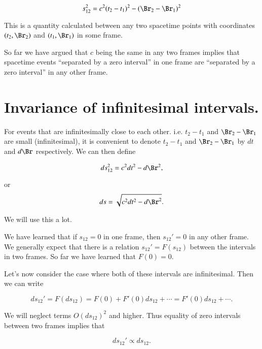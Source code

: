 \begin{equation}\label{eqn:relativisticElectrodynamicsL2:50}
s_{12}^2 = c^2 (t_2 - t_1)^2 - (\Br_2 - \Br_1)^2
\end{equation}

This is a quantity calculated between any two spacetime points with coordinates $(t_2, \Br_2)$ and $(t_1, \Br_1)$ in some frame.

So far we have argued that $c$ being the same in any two frames implies that spacetime events ``separated by a zero interval'' in one frame are ``separated by a zero interval'' in any other frame.

\section{Invariance of infinitesimal intervals.}

For events that are infinitesimally close to each other.  i.e. $t_2 - t_1$ and $\Br_2 -\Br_1$ are small (infinitesimal), it is convenient to denote $t_2 - t_1$ and $\Br_2 - \Br_1$ by $dt$ and $d\Br$ respectively.  We can then define

\begin{equation}\label{eqn:relativisticElectrodynamicsL2:60}
ds_{12}^2 = c^2 dt^2 - d\Br^2,
\end{equation}

or
\begin{equation}\label{eqn:relativisticElectrodynamicsL2:60b}
ds= \sqrt{c^2 dt^2 - d\Br^2}.
\end{equation}

We will use this a lot.

We have learned that if $s_{12} = 0$ in one frame, then $s_{12}' = 0$ in any other frame.  We generally expect that there is a relation $s_{12}' = F(s_12)$ between the intervals in two frames.  So far we have learned that $F(0) = 0$. 

Let's now consider the case where both of these intervals are infinitesimal.  Then we can write

\begin{equation}\label{eqn:relativisticElectrodynamicsL2:70}
ds_{12}' = F(ds_{12}) = F(0) + F'(0) ds_{12} + \cdots = F'(0) ds_{12} + \cdots.
\end{equation}

We will neglect terms $O(ds_{12})^2$ and higher.  Thus equality of zero intervals between two frames implies that 

\begin{equation}\label{eqn:relativisticElectrodynamicsL2:80}
ds_{12}' \propto ds_{12}.
\end{equation}

